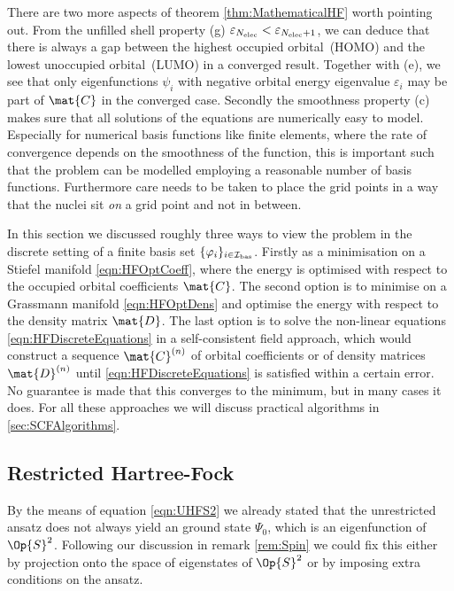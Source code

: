 \begin{rem}
There are two more aspects of theorem \ref{thm:MathematicalHF} worth pointing out.
From the unfilled shell property (g) $\varepsilon_{N_\text{elec}} < \varepsilon_{N_\text{elec}+1}$,
we can deduce that there is always a gap between the
highest occupied orbital~(HOMO) and the lowest unoccupied orbital~(LUMO)
in a converged \HF result.
Together with (e), we see that only eigenfunctions $\psi_i$
with negative orbital energy eigenvalue $\varepsilon_i$ may be part of $\mat{C}$
in the converged case.
Secondly the smoothness property (c) makes sure that
all solutions of the \HF equations are numerically easy to model.
Especially for numerical basis functions like finite elements,
where the rate of convergence depends on the smoothness of the function,
this is important such that the problem can be modelled
employing a reasonable number of basis functions.
Furthermore care needs to be taken to place the grid points
in a way that the nuclei sit \emph{on} a grid point and not in between.
\end{rem}

In this section we discussed roughly three ways to view the \HF
problem in the discrete setting of a finite basis set $\{\varphi_i\}_{i\in\mathcal{I}_\text{bas}}$.
Firstly as a minimisation on a Stiefel manifold \eqref{eqn:HFOptCoeff},
where the energy is optimised with respect to the occupied orbital coefficients
$\mat{C}$.
The second option is to minimise on a Grassmann manifold \eqref{eqn:HFOptDens}
and optimise the energy with respect to the density matrix $\mat{D}$.
The last option is to solve the non-linear \HF equations
\eqref{eqn:HFDiscreteEquations}
in a self-consistent field approach,
which would construct a sequence $\mat{C}^{(n)}$
of orbital coefficients or of density matrices $\mat{D}^{(n)}$
until \eqref{eqn:HFDiscreteEquations} is satisfied within a certain error.
No guarantee is made that this converges to the minimum,
but in many cases it does.
For all these approaches we will discuss practical
algorithms in \vref{sec:SCFAlgorithms}.

\subsection{Restricted Hartree-Fock}
By the means of equation \eqref{eqn:UHFS2}
we already stated
that the unrestricted \HF ansatz does not always
yield an \HF ground state $\Psi_0$,
which is an eigenfunction of $\Op{S}^2$.
Following our discussion in remark \vref{rem:Spin}
we could fix this either by projection onto the space of eigenstates
of $\Op{S}^2$ or by imposing extra conditions on the \HF ansatz.

